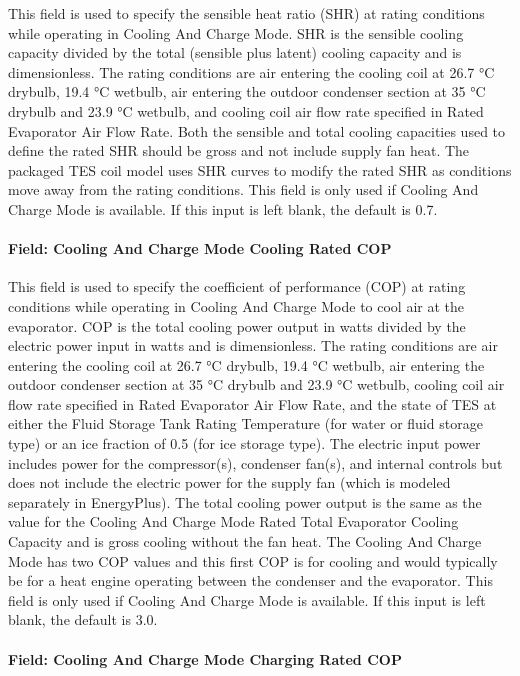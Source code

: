 This field is used to specify the sensible heat ratio (SHR) at rating conditions while operating in Cooling And Charge Mode. SHR is the sensible cooling capacity divided by the total (sensible plus latent) cooling capacity and is dimensionless. The rating conditions are air entering the cooling coil at 26.7 °C drybulb, 19.4 °C wetbulb, air entering the outdoor condenser section at 35 °C drybulb and 23.9 °C wetbulb, and cooling coil air flow rate specified in Rated Evaporator Air Flow Rate. Both the sensible and total cooling capacities used to define the rated SHR should be gross and not include supply fan heat. The packaged TES coil model uses SHR curves to modify the rated SHR as conditions move away from the rating conditions. This field is only used if Cooling And Charge Mode is available. If this input is left blank, the default is 0.7.

\paragraph{Field: Cooling And Charge Mode Cooling Rated COP}\label{field-cooling-and-charge-mode-cooling-rated-cop}

This field is used to specify the coefficient of performance (COP) at rating conditions while operating in Cooling And Charge Mode to cool air at the evaporator. COP is the total cooling power output in watts divided by the electric power input in watts and is dimensionless. The rating conditions are air entering the cooling coil at 26.7 °C drybulb, 19.4 °C wetbulb, air entering the outdoor condenser section at 35 °C drybulb and 23.9 °C wetbulb, cooling coil air flow rate specified in Rated Evaporator Air Flow Rate, and the state of TES at either the Fluid Storage Tank Rating Temperature (for water or fluid storage type) or an ice fraction of 0.5 (for ice storage type). The electric input power includes power for the compressor(s), condenser fan(s), and internal controls but does not include the electric power for the supply fan (which is modeled separately in EnergyPlus). The total cooling power output is the same as the value for the Cooling And Charge Mode Rated Total Evaporator Cooling Capacity and is gross cooling without the fan heat. The Cooling And Charge Mode has two COP values and this first COP is for cooling and would typically be for a heat engine operating between the condenser and the evaporator. This field is only used if Cooling And Charge Mode is available. If this input is left blank, the default is 3.0.

\paragraph{Field: Cooling And Charge Mode Charging Rated COP}\label{field-cooling-and-charge-mode-charging-rated-cop}

